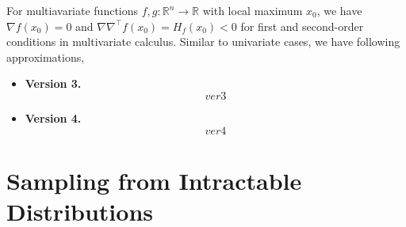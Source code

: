 \documentclass[fontsize=12pt]{article}
\begin{document}
For multiavariate functions $f,g : \mathbb{R}^n \rightarrow \mathbb{R}$ with local maximum $x_0$, we have $\nabla f(x_0) = 0$ and $\nabla \nabla^\top f(x_0) = H_f (x_0) < 0$ for first and second-order conditions in multivariate calculus. Similar to univariate cases, we have following approximations,
\begin{itemize}
	\item \textbf{Version 3.}
	\begin{equation}\label{eq:version3}
	ver3
	\end{equation}
	\item \textbf{Version 4.}
	\begin{equation}\label{eq:version4}
	ver4
	\end{equation}
\end{itemize}






\section{Sampling from Intractable Distributions}\label{sec:intractable}




\end{document}

